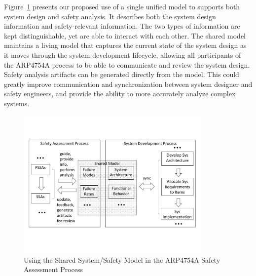 Figure~\ref{fig:proposed_safety_process} presents our proposed use of a single unified model to supports both system design and safety analysis. It describes both the system design information and safety-relevant information. The two types of information are kept distinguishable, yet are able to interact with each other. The shared model maintains a living model that captures the current state of the system design as it moves through the system development lifecycle, allowing all participants of the ARP4754A process to be able to communicate and review the system design. Safety analysis artifacts can be generated directly from the model. This could greatly improve communication and synchronization between system designer and safety engineers, and provide the ability to more accurately analyze complex systems. 

\begin{figure}[t!]
	\vspace{-0.45in}
	\centering
	\includegraphics[trim=0 9 0 5,clip,width=0.85\textwidth]{images/safety_process.pdf}
	\vspace{-0.45in}
	\caption{Using the Shared System/Safety Model in the ARP4754A Safety Assessment Process}
	\label{fig:proposed_safety_process}
\end{figure}

